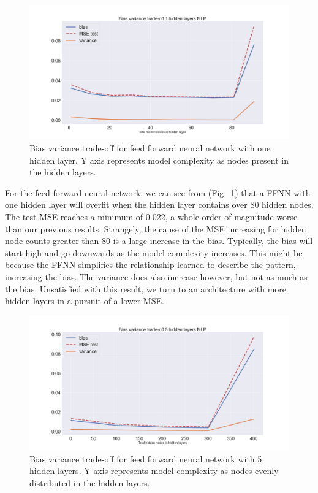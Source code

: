 \documentclass[onecolumn,10pt,cleanfoot]{asme2ej}
\begin{document}
\begin{figure}[H]
\centerline{\includegraphics[width=5in]{figs/BV_ffnn1.png}}
\caption{Bias variance trade-off for feed forward neural network with one hidden layer. Y axis represents model complexity as nodes present in the hidden layers.}
\label{ffnn1}
\end{figure}

For the feed forward neural network, we can see from (Fig.~\ref{ffnn1}) that a FFNN with one hidden layer will overfit when the hidden layer contains over 80 hidden nodes. The test MSE reaches a minimum of 0.022, a whole order of magnitude worse than our previous results. Strangely, the cause of the MSE increasing for hidden node counts greater than 80 is a large increase in the bias. Typically, the bias will start high and go downwards as the model complexity increases. This might be because the FFNN simplifies the relationship learned to describe the pattern, increasing the bias. The variance does also increase however, but not as much as the bias. Unsatisfied with this result, we turn to an architecture with more hidden layers in a pursuit of a lower MSE.

\begin{figure}[H]
\centerline{\includegraphics[width=5in]{figs/BV_ffnn5.png}}
\caption{Bias variance trade-off for feed forward neural network with 5 hidden layers. Y axis represents model complexity as nodes evenly distributed in the hidden layers.}
\label{ffnn5}
\end{figure}
\end{document}
